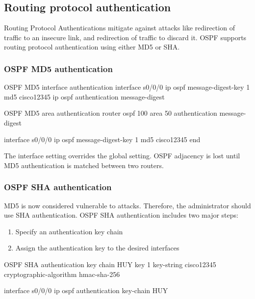 \subsection{Routing protocol authentication}

Routing Protocol Authentications mitigate against attacks like redirection of traffic to an insecure link, and redirection of traffic to discard it. OSPF supports routing protocol authentication using either MD5 or SHA.

\subsubsection{OSPF MD5 authentication}

\begin{sexylisting}{OSPF MD5 interface authentication}
interface s0/0/0
  ip ospf message-digest-key 1 md5 cisco12345
  ip ospf authentication message-digest
\end{sexylisting}

\begin{sexylisting}{OSPF MD5 area authentication}
router ospf 100
  area 50 authentication message-digest

interface s0/0/0
  ip ospf message-digest-key 1 md5 cisco12345
end
\end{sexylisting}

\note The interface setting overrides the global setting. OSPF adjacency is lost until MD5 authentication is matched between two routers.

\subsubsection{OSPF SHA authentication}

MD5 is now considered vulnerable to attacks. Therefore, the administrator should use SHA authentication. OSPF SHA authentication includes two major steps:

\begin{enumerate}
\item Specify an authentication key chain
\item Assign the authentication key to the desired interfaces 
\end{enumerate}

\begin{sexylisting}{OSPF SHA authentication}
key chain HUY
  key 1
  key-string cisco12345
  cryptographic-algorithm hmac-sha-256
  
interface s0/0/0
  ip ospf authentication key-chain HUY
\end{sexylisting}

